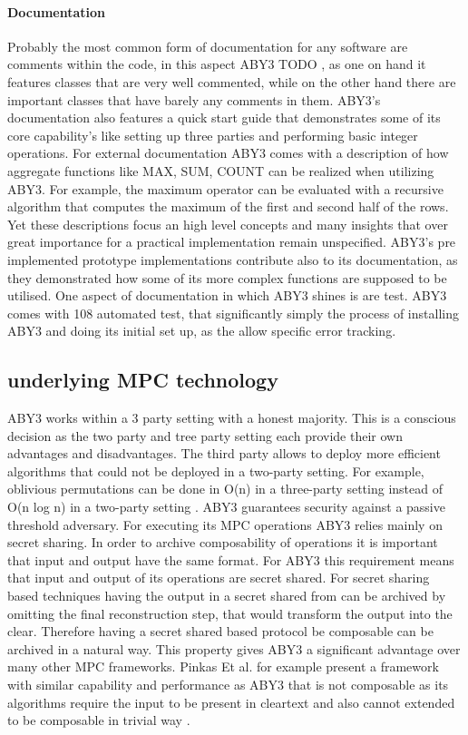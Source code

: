 \paragraph{Documentation} 
Probably the most common form of documentation for any software are comments within the code, in this aspect ABY3 TODO , as one on hand it features classes that are very well commented, while on the other hand there are important classes that have barely any comments in them. 
ABY3's documentation also features a quick start guide that demonstrates some of its core capability's like setting up three parties and performing basic integer operations.
For external documentation ABY3 comes with a description of how aggregate functions like MAX, SUM, COUNT can be realized when utilizing ABY3. For example, the maximum operator can be evaluated with a recursive algorithm that computes the maximum of the first and second half of the rows. Yet these descriptions focus an high level concepts and many insights that over great importance for a practical implementation remain unspecified. ABY3's pre implemented prototype implementations contribute also to its documentation, as they demonstrated how some of its more complex functions are supposed to be utilised. One aspect of documentation in which ABY3 shines is are test. ABY3 comes with 108 automated test, that significantly simply the process of installing ABY3 and doing its initial set up, as the allow specific error tracking.    


\subsection{underlying MPC technology}
ABY3 works within a 3 party setting with a honest majority. This is a conscious decision as the two party and tree party setting each provide their own advantages and disadvantages.
The third party allows to deploy more efficient algorithms that could not be deployed in a two-party setting. For example, oblivious permutations can be done in O(n) in a three-party setting instead of O(n log n) in a two-party setting \cite{aby3}.
 ABY3 guarantees security against a passive threshold adversary. For executing its MPC operations ABY3 relies mainly on secret sharing. In order to archive composability of operations it is important that input and output have the same format. For ABY3 this requirement means that input and output of its operations are secret shared. For secret sharing based techniques having the output in a secret shared from can be archived by omitting the final  reconstruction step, that would transform the output into the clear. Therefore having a secret shared based protocol be composable can be archived in a natural way. This property gives ABY3 a significant advantage over many other MPC frameworks. Pinkas Et al. \cite{pinkas2014faster} for example present a framework with similar capability and performance as ABY3 that is not composable as its algorithms require the input to be present in cleartext and also cannot extended to be composable in trivial way \cite{aby3}.      
  
